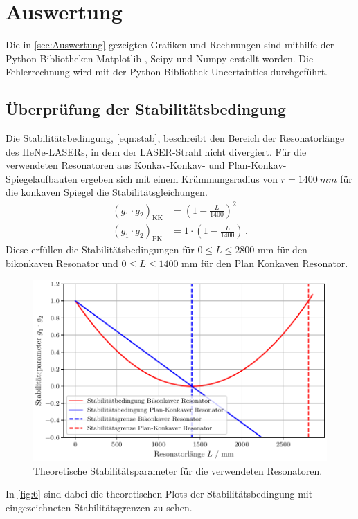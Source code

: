 \section{Auswertung}
\label{sec:Auswertung}
Die in \autoref{sec:Auswertung} gezeigten Grafiken und Rechnungen sind mithilfe der Python-Bibliotheken Matplotlib \cite{matplotlib}, Scipy \cite{scipy} und Numpy \cite{numpy}
erstellt worden. Die Fehlerrechnung wird mit der Python-Bibliothek Uncertainties \cite{uncertainties} durchgeführt.


\subsection{Überprüfung der Stabilitätsbedingung}
\label{sec:a1}
Die Stabilitätsbedingung, \autoref{eqn:stab}, beschreibt den Bereich der Resonatorlänge des HeNe-LASERs, in dem der LASER-Strahl nicht divergiert.
Für die verwendeten Resonatoren aus Konkav-Konkav- und Plan-Konkav-Spiegelaufbauten ergeben sich mit einem Krümmungsradius von $r = \SI{1400}{mm}$ für die konkaven Spiegel die Stabilitätsgleichungen.
\begin{align}
  \left(g_1 \cdot g_2\right)_{\text{KK}} &= \left( 1 - \frac{L}{1400} \right)^2 \\
  \left(g_1 \cdot g_2\right)_{\text{PK}} &= 1 \cdot \left( 1 - \frac{L}{1400} \right) \, .
\end{align}
Diese erfüllen die Stabilitätsbedingungen für $0 \leq L \leq 2800 \, \, \mathrm{mm}$ für den bikonkaven Resonator und $0 \leq L \leq 1400 \, \, \mathrm{mm}$ für den Plan Konkaven Resonator.
\begin{figure}[H]
  \centering
  \includegraphics[width=0.7\linewidth]{plots/stab_theo.pdf}
  \caption{Theoretische Stabilitätsparameter für die verwendeten Resonatoren.}
  \label{fig:6}
\end{figure}
\noindent
In \autoref{fig:6} sind dabei die theoretischen Plots der Stabilitätsbedingung mit eingezeichneten Stabilitätsgrenzen zu sehen.
